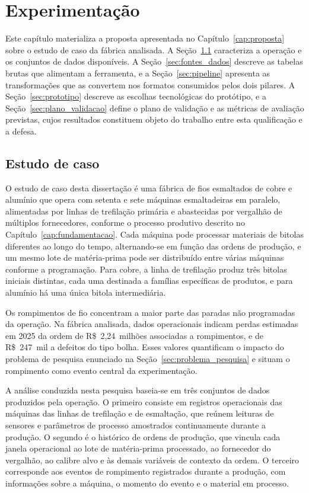 \chapter{Experimentação}
\label{cap:experimentacao}


Este capítulo materializa a proposta apresentada no Capítulo~\ref{cap:proposta} sobre o estudo de caso da fábrica analisada. A Seção~\ref{sec:estudo_caso} caracteriza a operação e os conjuntos de dados disponíveis. A Seção~\ref{sec:fontes_dados} descreve as tabelas brutas que alimentam a ferramenta, e a Seção~\ref{sec:pipeline} apresenta as transformações que as convertem nos formatos consumidos pelos dois pilares. A Seção~\ref{sec:prototipo} descreve as escolhas tecnológicas do protótipo, e a Seção~\ref{sec:plano_validacao} define o plano de validação e as métricas de avaliação previstas, cujos resultados constituem objeto do trabalho entre esta qualificação e a defesa.


\section{Estudo de caso}
\label{sec:estudo_caso}

O estudo de caso desta dissertação é uma fábrica de fios esmaltados de cobre e alumínio que opera com setenta e sete máquinas esmaltadeiras em paralelo, alimentadas por linhas de trefilação primária e abastecidas por vergalhão de múltiplos fornecedores, conforme o processo produtivo descrito no Capítulo~\ref{cap:fundamentacao}. Cada máquina pode processar materiais de bitolas diferentes ao longo do tempo, alternando-se em função das ordens de produção, e um mesmo lote de matéria-prima pode ser distribuído entre várias máquinas conforme a programação. Para cobre, a linha de trefilação produz três bitolas iniciais distintas, cada uma destinada a famílias específicas de produtos, e para alumínio há uma única bitola intermediária.

Os rompimentos de fio concentram a maior parte das paradas não programadas da operação. Na fábrica analisada, dados operacionais indicam perdas estimadas em 2025 da ordem de R\$~2,24~milhões associadas a rompimentos, e de R\$~247~mil a defeitos do tipo bolha. Esses valores quantificam o impacto do problema de pesquisa enunciado na Seção~\ref{sec:problema_pesquisa} e situam o rompimento como evento central da experimentação.

A análise conduzida nesta pesquisa baseia-se em três conjuntos de dados produzidos pela operação. O primeiro consiste em registros operacionais das máquinas das linhas de trefilação e de esmaltação, que reúnem leituras de sensores e parâmetros de processo amostrados continuamente durante a produção. O segundo é o histórico de ordens de produção, que vincula cada janela operacional ao lote de matéria-prima processado, ao fornecedor do vergalhão, ao calibre alvo e às demais variáveis de contexto da ordem. O terceiro corresponde aos eventos de rompimento registrados durante a produção, com informações sobre a máquina, o momento do evento e o material em processo.

